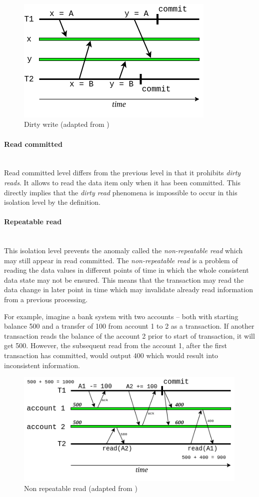 \documentclass[oneside,
  digital, %
  table,   %
  lof,     %
  lot,     %
]{fithesis3}
\newcommand{\newlinepar}[1]{\paragraph{#1}\needspace{4\baselineskip}\mbox{}\\}
\begin{document}
\hfill \break

\begin{figure}[h]
    \begin{center}
        \includegraphics[height=60mm]{images/dirtywrite.png}
    \end{center}
    \caption{Dirty write (adapted from \cite{isolation_levels})}
\end{figure}


\newlinepar{Read committed}

Read committed level differs from the previous level in that it prohibits \textit{dirty reads}. It allows to read the data item only when it has been committed. This directly implies that the \textit{dirty read} phenomena is impossible to occur in this isolation level by the definition.


\newlinepar{Repeatable read}

This isolation level prevents the anomaly called the \textit{non-repeatable read} which may still appear in read committed. The \textit{non-repeatable read} is a problem of reading the data values in different points of time in which the whole consistent data state may not be ensured. This means that the transaction may read the data change in later point in time which may invalidate already read information from a previous processing.

For example, imagine a bank system with two accounts -- both with starting balance 500 and a transfer of 100 from account 1 to 2 as a transaction. If another transaction reads the balance of the account 2 prior to start of transaction, it will get 500. However, the subsequent read from the account 1, after the first transaction has committed, would output 400 which would result into inconsistent information.

\begin{figure}[h]
    \begin{center}
        \includegraphics[height=55mm]{images/nonrepeatableread.png}
    \end{center}
    \caption{Non repeatable read (adapted from \cite{isolation_levels})}
\end{figure}
\end{document}
